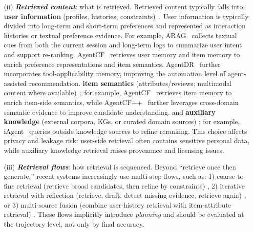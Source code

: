 {{{(ii) \textbf{\textit{Retrieved content}}: what is retrieved.}
Retrieved content typically falls into:
\textbf{user information} (profiles, histories, constraints)~\cite{huang2024interecagent,shu2024rah,wang2024recmind,yu2025intelligent_agent,maragheh2025arag,kim2026leveraging, wei2025enhanced, ao2025retrieval, ning2026retrieval, yang2025retrieval}. 
User information is typically divided into long-term and short-term preferences and represented as interaction histories or textual preference evidence. 
For example, ARAG~\cite{maragheh2025arag} collects textual cues from both the current session and long-term logs to summarize user intent and support re-ranking. AgentCF~\cite{zhang2023agentcf} retrieves user memory and item memory to enrich preference representations and item semantics. AgentDR~\cite{yang2025agentdr} further incorporates tool-applicability memory, improving the automation level of agent-assisted recommendation. 
\textbf{item semantics} (attributes/reviews; multimodal content where available)~\cite{zhang2023agentcf,liu2025agentcf++,kim2025itemrag, wang2025knowledge, qiu2025graph, kieu2025keyword, li2025g, xu2025rallrec, yang2025cold,balachandran2025visiorag,wei2025learning}; for example, AgentCF~\cite{zhang2023agentcf} retrieves item memory to enrich item-side semantics, while AgentCF++~\cite{liu2025agentcf++} further leverages cross-domain semantic evidence to improve candidate understanding. 
and \textbf{auxiliary knowledge} (external corpora, KGs, or curated domain sources)  \cite{maragheh2025arag,xu2025iagent,borgeaud2022improving,meng2025balancing}; for example, iAgent~\cite{xu2025iagent} queries outside knowledge sources to refine reranking. 
This choice affects privacy and leakage risk: user-side retrieval often contains sensitive personal data, while auxiliary knowledge retrieval raises provenance and licensing issues.} 


{{(iii) \textbf{\textit{Retrieval flows}}: how retrieval is sequenced.}
Beyond “retrieve once then generate,” recent systems increasingly use multi-step flows, such as:
1) {coarse-to-fine retrieval} (retrieve broad candidates, then refine by constraints) \cite{huang2024interecagent,maragheh2025arag,li2025rallm},
2) {iterative retrieval with reflection} (retrieve, draft, detect missing evidence, retrieve again) \cite{huang2024interecagent,xu2025iagent,zhang2025sarrec},
or 3) {multi-source fusion} (combine user-history retrieval with item-attribute retrieval) \cite{zhang2023agentcf,liu2025agentcf++,zeng2024federated}.
These flows implicitly introduce \emph{planning} and should be evaluated at the trajectory level, not only by final accuracy.} 

}
